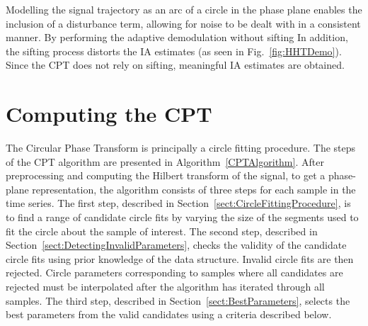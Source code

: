\documentclass[journal,11pt,a4paper,onecolumn,draftcls]{IEEEtran}
\newcommand{\todo}[1]{\textsf{\emph{\textbf{\textcolor{blue}{#1}}}}}
\begin{document}
Modelling the signal trajectory as an arc of a circle in the phase plane enables the inclusion of a disturbance term, allowing for noise to be dealt with in a consistent manner. By performing the adaptive demodulation without sifting In addition, the sifting process distorts the IA estimates (as seen in Fig.~\ref{fig:HHTDemo}). Since the CPT does not rely on sifting, meaningful IA estimates are obtained.


\section{Computing the CPT}\label{sect:ComputingCPTSection}

The Circular Phase Transform is principally a circle fitting procedure. The steps of the CPT algorithm are presented in Algorithm~\ref{CPTAlgorithm}. After preprocessing and computing the Hilbert transform of the signal, to get a phase-plane representation, the algorithm consists of three steps for each sample in the time series. The first step, described in Section~\ref{sect:CircleFittingProcedure}, is to find a range of candidate circle fits by varying the size of the segments used to fit the circle about the sample of interest. The second step, described in Section~\ref{sect:DetectingInvalidParameters}, checks the validity of the candidate circle fits using prior knowledge of the data structure. Invalid circle fits are then rejected. Circle parameters corresponding to samples where all candidates are rejected must be interpolated after the algorithm has iterated through all samples. The third step, described in Section~\ref{sect:BestParameters}, selects the best parameters from the valid candidates using a criteria described below. 
\end{document}

